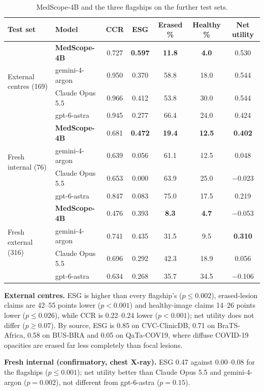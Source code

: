 \documentclass[11pt]{article}
\newcommand{\best}[1]{\textbf{#1}}
\begin{document}
\begin{table}[t]
\centering\footnotesize\setlength{\tabcolsep}{4pt}
\caption{MedScope-4B and the three flagships on the further test sets.}
\label{tab:ext}
\begin{tabular}{llccccc}
\toprule
Test set & Model & CCR & ESG & Erased \% & Healthy \% & Net utility \\
\midrule
\multirow{4}{*}{External centres (169)} & \textbf{MedScope-4B} & 0.727 & \best{0.597} & \best{11.8} & \best{4.0} & 0.530 \\
 & gemini-4-argon & 0.950 & 0.370 & 58.8 & 18.0 & 0.544 \\
 & Claude Opus 5.5 & 0.966 & 0.412 & 53.8 & 30.0 & 0.544 \\
 & gpt-6-astra & 0.945 & 0.277 & 66.4 & 24.0 & 0.424 \\
\midrule
\multirow{4}{*}{Fresh internal (76)} & \textbf{MedScope-4B} & 0.681 & \best{0.472} & \best{19.4} & \best{12.5} & \best{0.402} \\
 & gemini-4-argon & 0.639 & 0.056 & 61.1 & 12.5 & 0.048 \\
 & Claude Opus 5.5 & 0.653 & 0.000 & 63.9 & 25.0 & $-$0.023 \\
 & gpt-6-astra & 0.847 & 0.083 & 75.0 & 17.5 & 0.219 \\
\midrule
\multirow{4}{*}{Fresh external (316)} & \textbf{MedScope-4B} & 0.476 & 0.393 & \best{8.3} & \best{4.7} & $-$0.053 \\
 & gemini-4-argon & 0.741 & 0.435 & 31.5 & 9.5 & \best{0.310} \\
 & Claude Opus 5.5 & 0.696 & 0.292 & 42.3 & 18.9 & 0.056 \\
 & gpt-6-astra & 0.634 & 0.268 & 35.7 & 34.5 & $-$0.106 \\
\bottomrule
\end{tabular}
\end{table}

\textbf{External centres.} ESG is higher than every flagship's ($p\le0.002$), erased-lesion claims are 42--55 points lower ($p<0.001$) and healthy-image claims 14--26 points lower ($p\le0.026$), while CCR is 0.22--0.24 lower ($p<0.001$); net utility does not differ ($p\ge0.07$). By source, ESG is 0.85 on CVC-ClinicDB, 0.71 on BraTS-Africa, 0.58 on BUS-BRA and 0.05 on QaTa-COV19, where diffuse COVID-19 opacities are erased far less completely than focal lesions.

\textbf{Fresh internal (confirmatory, chest X-ray).} ESG 0.47 against 0.00--0.08 for the flagships ($p\le0.001$); net utility better than Claude Opus 5.5 and gemini-4-argon ($p=0.002$), not different from gpt-6-astra ($p=0.15$).
\end{document}
